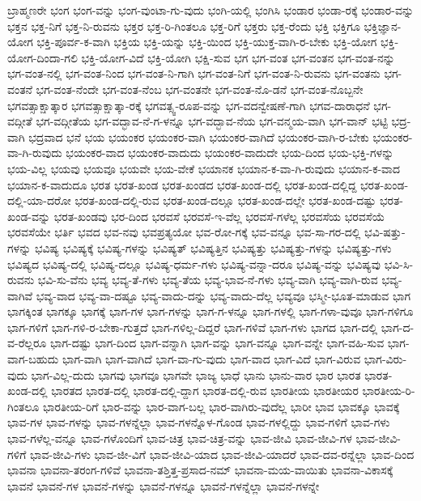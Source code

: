 {ಬ್ರಾಹ್ಮಣರೇ
ಭಂಗ
ಭಂಗ-ವನ್ನು
ಭಂಗ-ವುಂಟಾ-ಗು-ವುದು
ಭಂಗಿ-ಯಲ್ಲಿ
ಭಂಗಿಸಿ
ಭಂಡಾರ
ಭಂಡಾ-ರಕ್ಕೆ
ಭಂಡಾರ-ವನ್ನು
ಭಕ್ತನ
ಭಕ್ತ-ನಿಗೆ
ಭಕ್ತ-ನಿ-ರುವನು
ಭಕ್ತರ
ಭಕ್ತ-ರಿ-ಗಿಂತಲೂ
ಭಕ್ತ-ರಿಗೆ
ಭಕ್ತರು
ಭಕ್ತ-ರೆಂದು
ಭಕ್ತಿ
ಭಕ್ತಿಗೂ
ಭಕ್ತಿಜ್ಞಾನ-ಯೋಗ
ಭಕ್ತಿ-ಪೂರ್ವ-ಕ-ವಾಗಿ
ಭಕ್ತಿಯ
ಭಕ್ತಿ-ಯನ್ನು
ಭಕ್ತಿ-ಯಿಂದ
ಭಕ್ತಿ-ಯುಕ್ತ-ವಾಗಿ-ರ-ಬೇಕು
ಭಕ್ತಿ-ಯೋಗ
ಭಕ್ತಿ-ಯೋಗ-ದಿಂದಾ-ಗಲಿ
ಭಕ್ತಿ-ಯೋಗ-ವಿದೆ
ಭಕ್ತಿ-ಯೋಗಿ
ಭಕ್ಷಿ-ಸುವ
ಭಗ
ಭಗ-ವಂತ
ಭಗ-ವಂತನ
ಭಗ-ವಂತ-ನನ್ನು
ಭಗ-ವಂತ-ನಲ್ಲಿ
ಭಗ-ವಂತ-ನಿಂದ
ಭಗ-ವಂತ-ನಿ-ಗಾಗಿ
ಭಗ-ವಂತ-ನಿಗೆ
ಭಗ-ವಂತ-ನಿ-ರುವನು
ಭಗ-ವಂತನು
ಭಗ-ವಂತನೆ
ಭಗ-ವಂತ-ನೆಂದೇ
ಭಗ-ವಂತ-ನೆಂಬ
ಭಗ-ವಂತನೇ
ಭಗ-ವಂತ-ನೊ-ಡನೆ
ಭಗ-ವಂತ-ನೊಬ್ಬನೇ
ಭಗವತ್ಸಾಕ್ಷಾತ್ಕಾರ
ಭಗವತ್ಸಾಕ್ಷಾತ್ಕಾ-ರಕ್ಕೆ
ಭಗವತ್ಸ್ವ-ರೂಪ-ವನ್ನು
ಭಗ-ವದನ್ವೇಷಣೆ-ಗಾಗಿ
ಭಗವ-ದಾರಾಧನೆ
ಭಗ-ವದ್ಗೀತೆ
ಭಗ-ವದ್ಗೀತೆಯ
ಭಗ-ವದ್ಭಾವ-ನೆ-ಗ-ಳನ್ನೂ
ಭಗ-ವದ್ಭಾವ-ನೆಯ
ಭಗ-ವನ್ಮಯ-ವಾಗಿ
ಭಗ-ವಾನ್
ಭಟ್ಟಿ
ಭದ್ರ-ವಾಗಿ
ಭದ್ರವಾದ
ಭನೆ
ಭಯ
ಭಯಂಕರ
ಭಯಂಕರ-ವಾಗಿ
ಭಯಂಕರ-ವಾಗಿದೆ
ಭಯಂಕರ-ವಾಗಿ-ರ-ಬೇಕು
ಭಯಂಕರ-ವಾ-ಗಿ-ರುವುದು
ಭಯಂಕರ-ವಾದ
ಭಯಂಕರ-ವಾದುದು
ಭಯಂಕರ-ವಾದುದೇ
ಭಯ-ದಿಂದ
ಭಯ-ಭಕ್ತಿ-ಗಳನ್ನು
ಭಯ-ವಿಲ್ಲ
ಭಯವು
ಭಯವೂ
ಭಯವೇ
ಭಯ-ವೇಕೆ
ಭಯಾನಕ
ಭಯಾನ-ಕ-ವಾ-ಗಿ-ರುವುದು
ಭಯಾನ-ಕ-ವಾದ
ಭಯಾನ-ಕ-ವಾದುದೂ
ಭರತ
ಭರತ-ಖಂಡ
ಭರತ-ಖಂಡದ
ಭರತ-ಖಂಡ-ದಲ್ಲಿ
ಭರತ-ಖಂಡ-ದಲ್ಲಿದ್ದ
ಭರತ-ಖಂಡ-ದಲ್ಲಿ-ಯಾ-ದರೋ
ಭರತ-ಖಂಡ-ದಲ್ಲಿ-ರುವ
ಭರತ-ಖಂಡ-ದಲ್ಲೂ
ಭರತ-ಖಂಡ-ದಲ್ಲೇ
ಭರತ-ಖಂಡ-ದಷ್ಟು
ಭರತ-ಖಂಡ-ವನ್ನು
ಭರತ-ಖಂಡವು
ಭರ-ದಿಂದ
ಭರವಸೆ
ಭರವಸೆ-ಇ-ವೆಲ್ಲ
ಭರವಸೆ-ಗಳೆಲ್ಲ
ಭರವಸೆಯ
ಭರವಸೆಯೆ
ಭರವಸೆಯೇ
ಭರ್ತಿ
ಭವದ
ಭವ-ನವು
ಭವಪ್ರತ್ಯಯೋ
ಭವ-ರೋ-ಗಕ್ಕೆ
ಭವ-ವನ್ನೂ
ಭವ-ಸಾ-ಗರ-ದಲ್ಲಿ
ಭವಿ-ಷತ್ತು-ಗಳನ್ನು
ಭವಿಷ್ಯ
ಭವಿಷ್ಯಕ್ಕೆ
ಭವಿಷ್ಯ-ಗಳನ್ನು
ಭವಿಷ್ಯತ್
ಭವಿಷ್ಯತ್ತಿನ
ಭವಿಷ್ಯತ್ತು
ಭವಿಷ್ಯತ್ತು-ಗಳನ್ನು
ಭವಿಷ್ಯತ್ತು-ಗಳು
ಭವಿಷ್ಯದ
ಭವಿಷ್ಯ-ದಲ್ಲಿ
ಭವಿಷ್ಯ-ದಲ್ಲೂ
ಭವಿಷ್ಯ-ಧರ್ಮ-ಗಳು
ಭವಿಷ್ಯ-ವನ್ನಾ-ದರೂ
ಭವಿಷ್ಯ-ವನ್ನು
ಭವಿಷ್ಯವು
ಭವಿ-ಸಿ-ರುವನು
ಭವಿ-ಸು-ವೆನು
ಭವ್ಯ
ಭವ್ಯ-ತೆ-ಗಳು
ಭವ್ಯ-ತೆಯ
ಭವ್ಯ-ಭಾವ-ನೆ-ಗಳು
ಭವ್ಯ-ವಾಗಿ
ಭವ್ಯ-ವಾಗಿ-ರುವ
ಭವ್ಯ-ವಾಗಿವೆ
ಭವ್ಯ-ವಾದ
ಭವ್ಯ-ವಾ-ದಷ್ಟೂ
ಭವ್ಯ-ವಾದು-ದನ್ನು
ಭವ್ಯ-ವಾದು-ದೆಲ್ಲ
ಭವ್ಯವೂ
ಭಸ್ಮೀ-ಭೂತ-ಮಾಡುವ
ಭಾಗ
ಭಾಗಕ್ಕಿಂತ
ಭಾಗಕ್ಕೂ
ಭಾಗಕ್ಕೆ
ಭಾಗ-ಗಳ
ಭಾಗ-ಗಳನ್ನು
ಭಾಗ-ಗ-ಳನ್ನೂ
ಭಾಗ-ಗಳಲ್ಲಿ
ಭಾಗ-ಗಳಾ-ವುವೂ
ಭಾಗ-ಗಳಿಗೂ
ಭಾಗ-ಗಳಿಗೆ
ಭಾಗ-ಗಳಿ-ರ-ಬೇಕಾ-ಗುತ್ತದೆ
ಭಾಗ-ಗಳಿಲ್ಲ-ದಿದ್ದರೆ
ಭಾಗ-ಗಳಿವೆ
ಭಾಗ-ಗಳು
ಭಾಗದ
ಭಾಗ-ದಲ್ಲಿ
ಭಾಗ-ದ-ವ-ರೆಲ್ಲರೂ
ಭಾಗ-ದಷ್ಟು
ಭಾಗ-ದಿಂದ
ಭಾಗ-ವನ್ನಾಗಿ
ಭಾಗ-ವನ್ನು
ಭಾಗ-ವನ್ನೂ
ಭಾಗ-ವನ್ನೇ
ಭಾಗ-ವಹಿ-ಸುವ
ಭಾಗ-ವಾಗ-ಬಹುದು
ಭಾಗ-ವಾಗಿ
ಭಾಗ-ವಾಗಿದೆ
ಭಾಗ-ವಾ-ಗು-ವುದು
ಭಾಗ-ವಾದ
ಭಾಗ-ವಿದೆ
ಭಾಗ-ವಿರುವ
ಭಾಗ-ವಿರು-ವುದು
ಭಾಗ-ವಿಲ್ಲ-ದುದು
ಭಾಗವು
ಭಾಗವೂ
ಭಾಗವೇ
ಭಾಜ್ಯ
ಭಾಧೆ
ಭಾನು
ಭಾನು-ವಾರ
ಭಾರ
ಭಾರತ
ಭಾರತ-ಖಂಡ-ದಲ್ಲಿ
ಭಾರತದ
ಭಾರತ-ದಲ್ಲಿ
ಭಾರತ-ದಲ್ಲಿ-ದ್ದಾಗ
ಭಾರತ-ದಲ್ಲಿ-ರುವ
ಭಾರತೀಯ
ಭಾರತೀಯರ
ಭಾರತೀಯ-ರಿ-ಗಿಂತಲೂ
ಭಾರತೀಯ-ರಿಗೆ
ಭಾರ-ವನ್ನು
ಭಾರ-ವಾಗ-ಬಲ್ಲ
ಭಾರ-ವಾಗಿರು-ವುದೆಲ್ಲ
ಭಾರೀ
ಭಾವ
ಭಾವಕ್ಕೂ
ಭಾವಕ್ಕೆ
ಭಾವ-ಗಳ
ಭಾವ-ಗಳನ್ನು
ಭಾವ-ಗಳನ್ನೆಲ್ಲಾ
ಭಾವ-ಗಳನ್ನೊಳ-ಗೊಂಡ
ಭಾವ-ಗಳಲ್ಲಿದ್ದು
ಭಾವ-ಗಳಿಗೆ
ಭಾವ-ಗಳು
ಭಾವ-ಗಳೆಲ್ಲ-ವನ್ನೂ
ಭಾವ-ಗಳೊಂದಿಗೆ
ಭಾವ-ಚಿತ್ರ
ಭಾವ-ಚಿತ್ರ-ವನ್ನು
ಭಾವ-ಜೀವಿ
ಭಾವ-ಜೀವಿ-ಗಳ
ಭಾವ-ಜೀವಿ-ಗಳಿಗೆ
ಭಾವ-ಜೀವಿ-ಗಳು
ಭಾವ-ಜೀ-ವಿಗೆ
ಭಾವ-ಜೀವಿ-ಯಾದ
ಭಾವ-ಜೀವಿ-ಯಾದರೆ
ಭಾವ-ದವ-ರನ್ನೆಲ್ಲಾ
ಭಾವ-ದಿಂದ
ಭಾವನಾ
ಭಾವನಾ-ತರಂಗ-ಗಳಿವೆ
ಭಾವನಾ-ತಶ್ತಿತ್ತ-ಪ್ರಸಾದ-ನಮ್
ಭಾವನಾ-ಮಯ-ವಾಯಿತು
ಭಾವನಾ-ವಿಕಾಸಕ್ಕೆ
ಭಾವನೆ
ಭಾವನೆ-ಗಳ
ಭಾವನೆ-ಗಳನ್ನು
ಭಾವನೆ-ಗಳನ್ನೂ
ಭಾವನೆ-ಗಳನ್ನೆಲ್ಲಾ
ಭಾವನೆ-ಗಳನ್ನೇ
}
